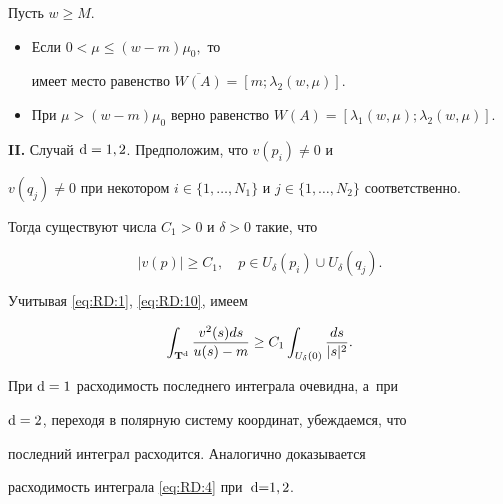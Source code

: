 \begin{theorem}[3]Пусть $w \geq M.$

\begin{itemize}

\item[{\rm 1.}] Если $0<\mu\leq(w-m) \mu_0,$ то

имеет место равенство $\overline{W(A)}{=}[m; \lambda_2(w, \mu)].$

\item[{\rm 2.}] При $\mu>(w-m) \mu_0$ верно равенство $W(A)=[\lambda_1(w,

\mu); \lambda_2(w, \mu)].$

\end{itemize}

\end{theorem}



\bigskip



{\bf II.} Случай ${\rm d}=1, 2$. Предположим, что $v(p_i) \neq 0$ и

$v(q_j) \neq 0$ при некотором $i \in \{ 1, \ldots, N_1 \}$ и $j

\in \{1, \ldots, N_2 \}$ соответственно. 

Тогда существуют числа $C_1>0$ и $\delta>0$ такие, что

\begin{equation}

|v(p)| \geq C_1,\quad p \in U_\delta(p_i) \cup U_\delta(q_j).

\label{eq:RD:10}

\end{equation}



Учитывая \eqref{eq:RD:1}, \eqref{eq:RD:10}, имеем

$$

\int _{{\bf T}^{\rm d}} \frac{v^2(s)ds}{u(s)-m}  \geq

C_1\int _{U_\delta(0)} \frac{ds}{|s|^2}.

$$



При ${\rm d}=1$ расходимость последнего интеграла очевидна, а~при

${\rm d}=2$, переходя в полярную систему координат, убеждаемся, что

последний интеграл расходится. Аналогично доказывается

расходимость интеграла \eqref{eq:RD:4} при~\mbox{${\rm d}{=}1, 2$.}







